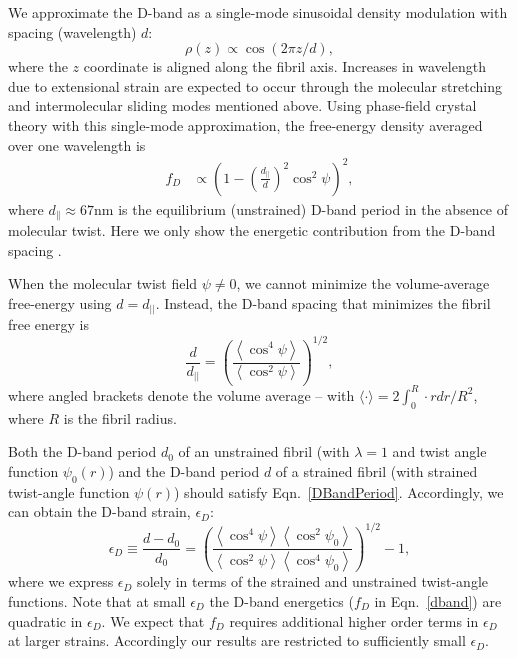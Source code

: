 \documentclass[preprint,12pt]{elsarticle}
\begin{document}
We approximate the D-band as a single-mode sinusoidal density modulation with spacing (wavelength) $d$:
\begin{equation}
\rho(z)  \propto \cos(2 \pi z/d),
\end{equation}
where the $z$ coordinate is aligned along the fibril axis. Increases in wavelength due to extensional strain are expected to occur through the molecular stretching and intermolecular sliding modes mentioned above. Using phase-field crystal theory with this single-mode approximation, the free-energy density averaged over one wavelength is \cite{Cameron:2020, Leighton:2021}
\begin{equation}
\begin{aligned}
f_D & \propto \left(1 - \left( \frac{d_{||}}{d} \right)^2 \cos^2\psi\right)^2,
\end{aligned} \label{dband}
\end{equation}
where $d_\parallel \approx 67\mathrm{nm}$ is the equilibrium (unstrained) D-band period in the absence of molecular twist. Here we only show the energetic contribution from the D-band spacing \cite{Cameron:2020, Leighton:2021}. 

When the molecular twist field $\psi \neq 0$, we cannot minimize the volume-average free-energy using  $d=d_{||}$.  Instead, the D-band spacing that  minimizes the fibril free energy is \cite{Leighton:2021}
\begin{equation}\label{DBandPeriod}
\frac{d}{d_{||}} = \left( \frac{\left\langle \cos^4\psi\right\rangle}{\left\langle \cos^2\psi\right\rangle}\right)^{1/2},
\end{equation}
where angled brackets denote the volume average -- with $\langle \cdot\rangle = 2 \int_0^R \cdot r dr /R^2$, where $R$ is the fibril radius.

Both the D-band period $d_0$ of an unstrained fibril (with $\lambda=1$ and twist angle function $\psi_0(r)$) and the D-band period $d$ of a strained fibril (with strained twist-angle function $\psi(r)$) should satisfy Eqn.~\ref{DBandPeriod}. Accordingly, we can obtain the D-band strain, $\epsilon_D$:
\begin{equation} \label{dbandstraineq}
\epsilon_D \equiv \frac{d-d_0}{d_0}  =\left( \frac{\left\langle \cos^4\psi\right\rangle\left\langle \cos^2\psi_0\right\rangle}{\left\langle \cos^2\psi\right\rangle\left\langle \cos^4\psi_0\right\rangle}\right)^{1/2}-1, 
\end{equation}
where we express $\epsilon_D$ solely in terms of the strained and unstrained twist-angle functions. Note that at small $\epsilon_D$ the D-band energetics ($f_D$ in Eqn.~\ref{dband}) are quadratic in $\epsilon_D$. We expect that $f_D$ requires additional higher order terms in $\epsilon_D$ at larger strains. Accordingly our results are restricted to sufficiently small $\epsilon_D$. 
\end{document}

